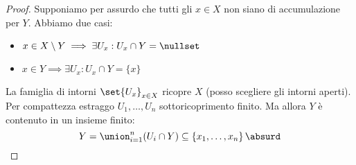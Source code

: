 \begin{proof}
	Supponiamo per assurdo che tutti gli $x\in X$ non siano di accumulazione per $Y$.
	Abbiamo due casi:
	\begin{itemize}
		\item $x\in X\setminus Y\implies \exists U_x:U_x\cap Y = \nullset$
		\item $x\in Y\implies \exists U_x:U_x\cap Y = \{ x \}$
	\end{itemize}
	La famiglia di intorni $\set{U_x}_{x\in X}$ ricopre $X$ (posso scegliere gli intorni aperti).
	Per compattezza estraggo $U_1,\dots, U_n$ sottoricoprimento finito.
	Ma allora $Y$ è contenuto in un insieme finito:
	\[Y=\union_{i=1}^n(U_i\cap Y)\subseteq \left \{ x_1,\dots,x_n\right \}\absurd\qedhere\]
\end{proof}
